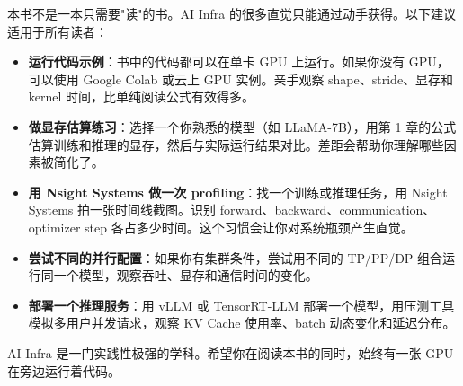 本书不是一本只需要"读"的书。AI Infra 的很多直觉只能通过动手获得。以下建议适用于所有读者：

\begin{itemize}
\item \textbf{运行代码示例}：书中的代码都可以在单卡 GPU 上运行。如果你没有 GPU，可以使用 Google Colab 或云上 GPU 实例。亲手观察 shape、stride、显存和 kernel 时间，比单纯阅读公式有效得多。
\item \textbf{做显存估算练习}：选择一个你熟悉的模型（如 LLaMA-7B），用第 1 章的公式估算训练和推理的显存，然后与实际运行结果对比。差距会帮助你理解哪些因素被简化了。
\item \textbf{用 Nsight Systems 做一次 profiling}：找一个训练或推理任务，用 Nsight Systems 拍一张时间线截图。识别 forward、backward、communication、optimizer step 各占多少时间。这个习惯会让你对系统瓶颈产生直觉。
\item \textbf{尝试不同的并行配置}：如果你有集群条件，尝试用不同的 TP/PP/DP 组合运行同一个模型，观察吞吐、显存和通信时间的变化。
\item \textbf{部署一个推理服务}：用 vLLM 或 TensorRT-LLM 部署一个模型，用压测工具模拟多用户并发请求，观察 KV Cache 使用率、batch 动态变化和延迟分布。
\end{itemize}

AI Infra 是一门实践性极强的学科。希望你在阅读本书的同时，始终有一张 GPU 在旁边运行着代码。